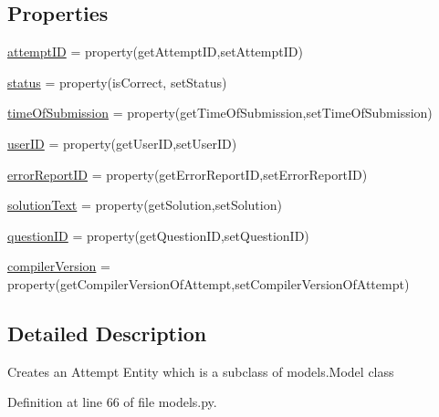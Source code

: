 \subsection*{Properties}
\begin{DoxyCompactItemize}
\item 
\hyperlink{class_ecodena_1_1_attempt_1_1models_1_1_attempt_a69f17e74058d4360d4ca443bd5c27cbc}{attemptID} = property(getAttemptID,setAttemptID)
\item 
\hyperlink{class_ecodena_1_1_attempt_1_1models_1_1_attempt_a1110fd10d7a9e73bae4c5f4208f24d9b}{status} = property(isCorrect, setStatus)
\item 
\hyperlink{class_ecodena_1_1_attempt_1_1models_1_1_attempt_a7ca881b180c5ce4d8e3169d0836422b7}{timeOfSubmission} = property(getTimeOfSubmission,setTimeOfSubmission)
\item 
\hyperlink{class_ecodena_1_1_attempt_1_1models_1_1_attempt_a30b68dbbff514c8422ba89a5e65e0e7d}{userID} = property(getUserID,setUserID)
\item 
\hyperlink{class_ecodena_1_1_attempt_1_1models_1_1_attempt_a76b4e1e2270faa387469f0a6b5bd47ec}{errorReportID} = property(getErrorReportID,setErrorReportID)
\item 
\hyperlink{class_ecodena_1_1_attempt_1_1models_1_1_attempt_a0ef6767e7f18226ecd46be45e35f357b}{solutionText} = property(getSolution,setSolution)
\item 
\hyperlink{class_ecodena_1_1_attempt_1_1models_1_1_attempt_af6d21b0d06e1565c641f9526ab4891d4}{questionID} = property(getQuestionID,setQuestionID)
\item 
\hyperlink{class_ecodena_1_1_attempt_1_1models_1_1_attempt_a38af788c738d633909699708872e5e3d}{compilerVersion} = property(getCompilerVersionOfAttempt,setCompilerVersionOfAttempt)
\end{DoxyCompactItemize}


\subsection{Detailed Description}
\begin{DoxyVerb}Creates an Attempt Entity which is a subclass of models.Model class\end{DoxyVerb}
 

Definition at line 66 of file models.py.



